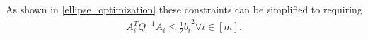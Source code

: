 % 

As shown in \cref{ellipse_optimization} these constraints can be simplified to requiring
\begin{align*}
A_i^T  Q^{-1}A_i \le \frac 1 2 \bar{b_i}^2 \forall i \in [m].
\end{align*}


